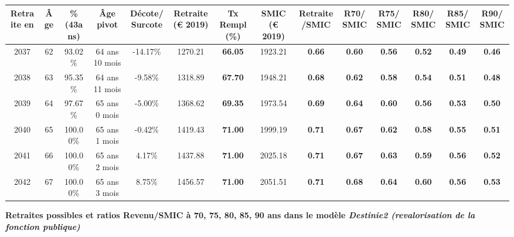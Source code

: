 \begin{adjustbox}{max width=\textwidth} 
\begin{tabular}[htb]{|c|c||c|c|c||c|c||c|c||c|c|c|c|c|} 
\hline 
 Retraite en &  Âge &  \%(43ans) &  Âge pivot &  Décote/Surcote &  Retraite (\euro{} 2019) &  Tx Rempl(\%) &  SMIC (\euro{} 2019) &  Retraite/SMIC &  R70/SMIC &  R75/SMIC &  R80/SMIC &  R85/SMIC &  R90/SMIC \\ 
\hline \hline 
 2037 &  62 &  93.02\% &  64 ans 10 mois &  -14.17\% &  1270.21 &  {\bf 66.05} &  1923.21 &  {\bf {\color{red} 0.66}} &  {\bf {\color{red} 0.60}} &  {\bf {\color{red} 0.56}} &  {\bf {\color{red} 0.52}} &  {\bf {\color{red} 0.49}} &  {\bf {\color{red} 0.46}} \\ 
\hline 
 2038 &  63 &  95.35\% &  64 ans 11 mois &  -9.58\% &  1318.89 &  {\bf 67.70} &  1948.21 &  {\bf {\color{red} 0.68}} &  {\bf {\color{red} 0.62}} &  {\bf {\color{red} 0.58}} &  {\bf {\color{red} 0.54}} &  {\bf {\color{red} 0.51}} &  {\bf {\color{red} 0.48}} \\ 
\hline 
 2039 &  64 &  97.67\% &  65 ans 0 mois &  -5.00\% &  1368.62 &  {\bf 69.35} &  1973.54 &  {\bf {\color{red} 0.69}} &  {\bf {\color{red} 0.64}} &  {\bf {\color{red} 0.60}} &  {\bf {\color{red} 0.56}} &  {\bf {\color{red} 0.53}} &  {\bf {\color{red} 0.50}} \\ 
\hline 
 2040 &  65 &  100.00\% &  65 ans 1 mois &  -0.42\% &  1419.43 &  {\bf 71.00} &  1999.19 &  {\bf {\color{red} 0.71}} &  {\bf {\color{red} 0.67}} &  {\bf {\color{red} 0.62}} &  {\bf {\color{red} 0.58}} &  {\bf {\color{red} 0.55}} &  {\bf {\color{red} 0.51}} \\ 
\hline 
 2041 &  66 &  100.00\% &  65 ans 2 mois &  4.17\% &  1437.88 &  {\bf 71.00} &  2025.18 &  {\bf {\color{red} 0.71}} &  {\bf {\color{red} 0.67}} &  {\bf {\color{red} 0.63}} &  {\bf {\color{red} 0.59}} &  {\bf {\color{red} 0.56}} &  {\bf {\color{red} 0.52}} \\ 
\hline 
 2042 &  67 &  100.00\% &  65 ans 3 mois &  8.75\% &  1456.57 &  {\bf 71.00} &  2051.51 &  {\bf {\color{red} 0.71}} &  {\bf {\color{red} 0.68}} &  {\bf {\color{red} 0.64}} &  {\bf {\color{red} 0.60}} &  {\bf {\color{red} 0.56}} &  {\bf {\color{red} 0.53}} \\ 
\hline 
\hline 
\end{tabular} 
\end{adjustbox} 
 
 \vspace{0.1cm} 
{\bf \noindent Retraites possibles et ratios Revenu/SMIC à 70, 75, 80, 85, 90 ans dans le modèle \emph{Destinie2 (revalorisation de la fonction publique)}}  
 
